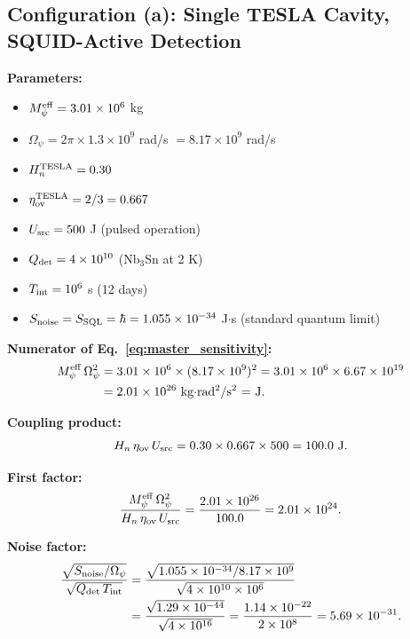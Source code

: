 \documentclass[11pt]{article}
\theoremstyle{definition}
\theoremstyle{remark}
\newcommand{\Opsi}{\Omega_\psi}
\newcommand{\Meff}{M_\psi^{\rm eff}}
\newcommand{\ee}[1]{\times 10^{#1}}
\begin{document}
\subsection{Configuration (a): Single TESLA Cavity, SQUID-Active Detection}
\label{sec:single_tesla}

\textbf{Parameters:}
\begin{itemize}[nosep]
\item $\Meff = 3.01\ee{6}$ kg
\item $\Opsi = 2\pi\times1.3\ee{9}$ rad/s $= 8.17\ee{9}$ rad/s
\item $H_n^{\rm TESLA} = 0.30$
\item $\eta_{\rm ov}^{\rm TESLA} = 2/3 = 0.667$
\item $U_{\rm src} = 500$ J (pulsed operation)
\item $Q_{\rm det} = 4\ee{10}$ (Nb$_3$Sn at 2 K)
\item $T_{\rm int} = 10^6$ s (12 days)
\item $S_{\rm noise} = S_{\rm SQL} = \hbar = 1.055\ee{-34}$ J$\cdot$s
  (standard quantum limit)
\end{itemize}

\textbf{Numerator of Eq.~\eqref{eq:master_sensitivity}:}
\begin{align}
\Meff\,\Opsi^2 &= 3.01\ee{6}\times(8.17\ee{9})^2
= 3.01\ee{6}\times6.67\ee{19}
\nonumber\\
&= 2.01\ee{26}~\text{kg$\cdot$rad$^2$/s$^2$ = J}.
\label{eq:tesla_num1}
\end{align}

\textbf{Coupling product:}
\begin{equation}
H_n\,\eta_{\rm ov}\,U_{\rm src} = 0.30\times0.667\times500
= 100.0~\text{J}.
\label{eq:tesla_coupling}
\end{equation}

\textbf{First factor:}
\begin{equation}
\frac{\Meff\,\Opsi^2}{H_n\,\eta_{\rm ov}\,U_{\rm src}}
= \frac{2.01\ee{26}}{100.0} = 2.01\ee{24}.
\label{eq:tesla_factor1}
\end{equation}

\textbf{Noise factor:}
\begin{align}
\frac{\sqrt{S_{\rm noise}/\Opsi}}{\sqrt{Q_{\rm det}\,T_{\rm int}}}
&= \frac{\sqrt{1.055\ee{-34}/8.17\ee{9}}}
{\sqrt{4\ee{10}\times10^{6}}}
\nonumber\\
&= \frac{\sqrt{1.29\ee{-44}}}{\sqrt{4\ee{16}}}
= \frac{1.14\ee{-22}}{2\ee{8}}
= 5.69\ee{-31}.
\label{eq:tesla_noise}
\end{align}
\end{document}
